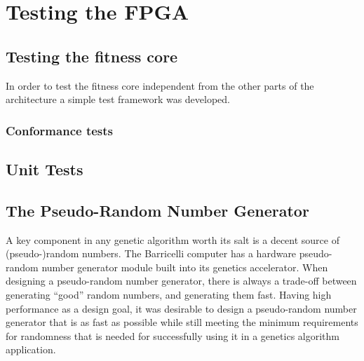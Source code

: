\section{Testing the FPGA}

\subsection{Testing the fitness core}
In order to test the fitness core independent from the other parts of the architecture a simple test framework was developed. 


\subsubsection{Conformance tests}
























\subsection{Unit Tests}

\subsection{The Pseudo-Random Number Generator}

A key component in any genetic algorithm worth its salt is a decent source of (pseudo-)random numbers.
The Barricelli computer has a hardware pseudo-random number generator module built into its genetics accelerator.
When designing a pseudo-random number generator, there is always a trade-off between generating ``good'' random numbers, and generating them fast.
Having high performance as a design goal\cn, it was desirable to design a pseudo-random number generator that is as fast as possible while still meeting the minimum requirements for randomness that is needed for successfully using it in a genetics algorithm application.

